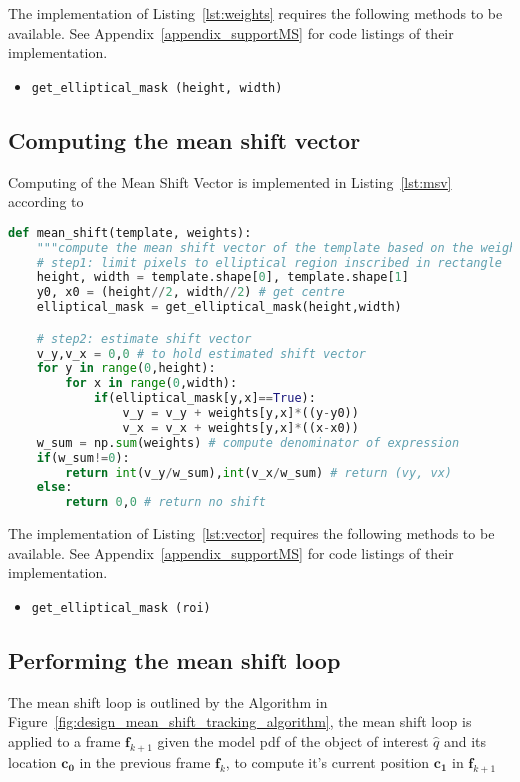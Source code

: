 The implementation of Listing~\ref{lst:weights} requires the following methods to
be available. See Appendix~\ref{appendix_supportMS} for code listings of their implementation. 
\begin{itemize}
    \item \lstinline{get_elliptical_mask (height, width)}
\end{itemize}

\subsection{Computing the mean shift vector}
Computing of the Mean Shift Vector is implemented in Listing~\ref{lst:msv}
according to %

\begin{lstlisting}[language=Python, caption={Function computing the mean shift vector}, captionpos=b, label={lst:msv}]
def mean_shift(template, weights):
    """compute the mean shift vector of the template based on the weights"""
    # step1: limit pixels to elliptical region inscribed in rectangle
    height, width = template.shape[0], template.shape[1]
    y0, x0 = (height//2, width//2) # get centre 
    elliptical_mask = get_elliptical_mask(height,width)

    # step2: estimate shift vector
    v_y,v_x = 0,0 # to hold estimated shift vector
    for y in range(0,height):
        for x in range(0,width): 
            if(elliptical_mask[y,x]==True):
                v_y = v_y + weights[y,x]*((y-y0)) 
                v_x = v_x + weights[y,x]*((x-x0))
    w_sum = np.sum(weights) # compute denominator of expression
    if(w_sum!=0):
        return int(v_y/w_sum),int(v_x/w_sum) # return (vy, vx)
    else:
        return 0,0 # return no shift
\end{lstlisting}

The implementation of Listing~\ref{lst:vector} requires the following methods to
be available. See Appendix~\ref{appendix_supportMS} for code listings of their implementation. 
\begin{itemize}
    \item \lstinline{get_elliptical_mask (roi)}
\end{itemize}

\subsection{Performing the mean shift loop}
The mean shift loop is outlined by the Algorithm in
Figure~\ref{fig:design_mean_shift_tracking_algorithm}, the mean shift loop is
applied to a frame $\mathbf{f}_{k+1}$ given the model pdf of the object of
interest $\hat{q}$ and its location $\mathbf{c_0}$ in the previous frame
$\mathbf{f}_{k}$, to compute it's current position $\mathbf{c_1}$ in
$\mathbf{f}_{k+1}$

